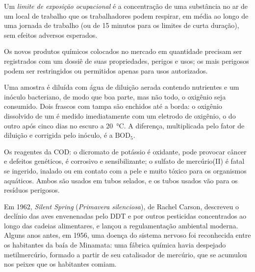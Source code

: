 \begin{definition}\label{def:b3:environmental-toxicology:oel}
Um \emph{limite de exposição ocupacional} é a
concentração de uma substância no ar de um local de trabalho que os trabalhadores podem respirar,
em média ao longo de uma jornada de trabalho (ou de 15 minutos para os limites de curta duração), sem
efeitos adversos esperados.
\end{definition}

Os novos produtos químicos colocados no mercado em quantidade precisam ser registrados com um
dossiê de suas propriedades, perigos e usos; os mais perigosos podem ser
restringidos ou permitidos apenas para usos autorizados.

\begin{inthelab}
Uma amostra é diluída com água de diluição aerada contendo nutrientes e um
inóculo bacteriano, de modo que boa parte, mas não todo, o oxigênio seja consumido. Dois
frascos com tampa são enchidos até a borda: o oxigênio dissolvido de um é medido
imediatamente com um eletrodo de oxigênio, o do outro após cinco dias no escuro a
\qty{20}{\celsius}. A diferença, multiplicada pelo fator de diluição e corrigida pelo inóculo, é a
$\mathrm{BOD_5}$.
\end{inthelab}

\begin{safety}{}
Os reagentes da COD: o dicromato de potássio é oxidante, pode provocar câncer e
defeitos genéticos, é corrosivo e sensibilizante; o sulfato de mercúrio(II) é fatal se
ingerido, inalado ou em contato com a pele e muito tóxico para os organismos aquáticos. Ambos são
usados em tubos selados, e os tubos usados vão para os resíduos perigosos.
\end{safety}

\begin{history}
Em 1962, \textit{Silent Spring} (\textit{Primavera silenciosa}), de Rachel Carson, descreveu o declínio das aves envenenadas pelo
DDT e por outros pesticidas concentrados ao longo das cadeias alimentares, e lançou a regulamentação
ambiental moderna. Alguns anos antes, em 1956, uma doença do sistema
nervoso foi reconhecida entre os habitantes da baía de Minamata: uma fábrica química havia
despejado metilmercúrio, formado a partir de seu catalisador de mercúrio, que se acumulou
nos peixes que os habitantes comiam.
\end{history}


